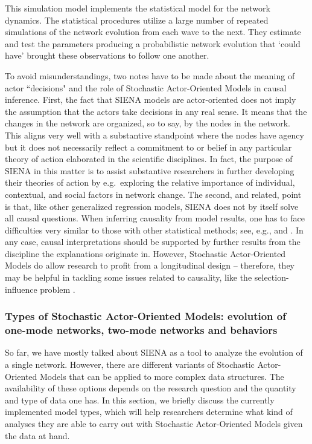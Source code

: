 \documentclass[a4paper,fleqn,11pt]{article}
\newcommand{\+}{\, + \,}
\newcommand{\SI}{{\sf SIENA }}
\newcommand{\saom}{{Stochastic Actor-Oriented Model}}
\begin{document}
This simulation model implements the statistical model
for the network dynamics. The statistical procedures utilize
a large number of repeated simulations of the network evolution
from each wave to the next. They estimate and test the parameters
producing a probabilistic network evolution
that `could have' brought these observations to follow one another.

To avoid misunderstandings, two notes have to be made about the
meaning of actor ``decisions" and the role of {\saom}s in causal inference.
First, the fact that \SI models are actor-oriented does not imply the assumption
that the actors take
decisions in any real sense. It means that the changes in the network are
organized, so to say, by the nodes in the network. This aligns very well
with a substantive standpoint where the nodes have agency \citep{Snijders96}
but it does not necessarily reflect a commitment to or belief in any particular
theory of action elaborated in
the scientific disciplines. In fact, the purpose of \SI in this matter is
to assist substantive researchers in further developing their theories
of action by e.g.\ exploring the relative importance of individual,
contextual, and social factors in network change. The second, and related,
point is that, like other generalized regression models, \SI does not
by itself solve all causal questions. When inferring causality from model
results, one has to face difficulties very similar to those with other
statistical methods; see, e.g., \citet{LSST11} and \citet{Goldthorpe2001}.
In any case, causal interpretations should be supported by further results
from the discipline the explanations originate in.
However, {\saom}s do allow research to profit from a longitudinal
design -- therefore, they may be helpful in tackling some issues related
to causality, like the selection-influence problem \citep{SteglichEA10, LSST11}.

\subsubsection[Types of {\saom}s]
     {Types of {\saom}s: \protect\newline
     evolution of one-mode networks, two-mode networks and behaviors}
\label{S_types}

So far, we have mostly talked about \SI as a tool to analyze the evolution
of a single network. However, there are different variants of {\saom}s that
can be applied to more complex data structures.
The availability of these options depends on the research question and the
quantity and type of data one has. In this section, we briefly discuss the
currently implemented model types, which will help researchers determine what
kind of analyses they are able to carry out with {\saom}s
given the data at hand.
\end{document}
